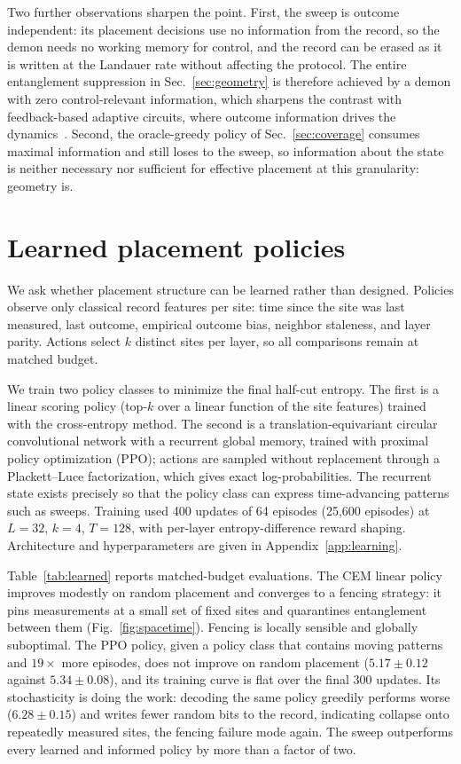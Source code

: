 \documentclass[aps,prb,twocolumn,superscriptaddress,nofootinbib]{revtex4-2}
\begin{document}
Two further observations sharpen the point. First, the sweep is outcome
independent: its placement decisions use no information from the record,
so the demon needs no working memory for control, and the record can be
erased as it is written at the Landauer rate without affecting the
protocol. The entire entanglement suppression in Sec.~\ref{sec:geometry}
is therefore achieved by a demon with zero control-relevant information,
which sharpens the contrast with feedback-based adaptive circuits, where
outcome information drives the
dynamics~\cite{Iadecola2023,Sierant2023,ODea2024,Buchhold2022,Piroli2023}.
Second, the oracle-greedy policy of Sec.~\ref{sec:coverage} consumes
maximal information and still loses to the sweep, so information about the
state is neither necessary nor sufficient for effective placement at this
granularity: geometry is.

\section{Learned placement policies}
\label{sec:learned}

We ask whether placement structure can be learned rather than designed.
Policies observe only classical record features per site: time since the
site was last measured, last outcome, empirical outcome bias, neighbor
staleness, and layer parity. Actions select $k$ distinct sites per layer,
so all comparisons remain at matched budget.

We train two policy classes to minimize the final half-cut entropy. The
first is a linear scoring policy (top-$k$ over a linear function of the
site features) trained with the cross-entropy method. The second is a
translation-equivariant circular convolutional network with a recurrent
global memory, trained with proximal policy optimization (PPO); actions
are sampled without replacement through a Plackett--Luce factorization,
which gives exact log-probabilities. The recurrent state exists precisely
so that the policy class can express time-advancing patterns such as
sweeps. Training used 400 updates of 64 episodes (25{,}600 episodes) at
$L = 32$, $k = 4$, $T = 128$, with per-layer entropy-difference reward
shaping. Architecture and hyperparameters are given in
Appendix~\ref{app:learning}.

Table~\ref{tab:learned} reports matched-budget evaluations. The CEM linear
policy improves modestly on random placement and converges to a fencing
strategy: it pins measurements at a small set of fixed sites and
quarantines entanglement between them (Fig.~\ref{fig:spacetime}). Fencing
is locally sensible and globally suboptimal. The PPO policy, given a
policy class that contains moving patterns and $19\times$ more episodes,
does not improve on random placement ($5.17 \pm 0.12$ against
$5.34 \pm 0.08$), and its training curve is flat over the final 300
updates. Its stochasticity is doing the work: decoding the same policy
greedily performs worse ($6.28 \pm 0.15$) and writes fewer random bits to
the record, indicating collapse onto repeatedly measured sites, the
fencing failure mode again. The sweep outperforms every learned and
informed policy by more than a factor of two.
\end{document}
